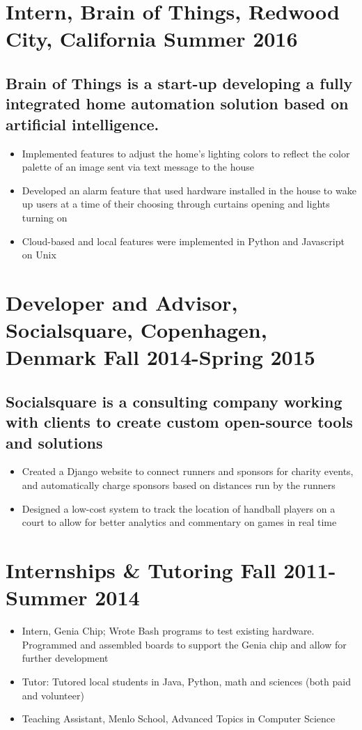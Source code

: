 \documentclass{article}
\begin{document}
\section*{\textbf{Intern, Brain of Things, Redwood City, California	\hfill Summer 2016}}
\subsection*{Brain of Things is a start-up developing a fully integrated home automation solution based on artificial intelligence. }
\begin{itemize}[noitemsep]
    \item Implemented features to adjust the home's lighting colors to reflect the color palette of an image sent via text message to the house 
    \item Developed an alarm feature that used hardware installed in the house to wake up users at a time of their choosing through curtains opening and lights turning on
    \item Cloud-based and local features were implemented in Python and Javascript on Unix
\end{itemize}

\section*{\textbf{Developer and Advisor, Socialsquare, Copenhagen, Denmark \hfill Fall 2014-Spring 2015}}
\subsection*{Socialsquare is a consulting company working with clients to create custom open-source tools and solutions}
\begin{itemize}[noitemsep]
    \item Created a Django website to connect runners and sponsors for charity events, and automatically charge sponsors based on distances run by the runners
    \item Designed a low-cost system to track the location of handball players on a court to allow for better analytics and commentary on games in real time
\end{itemize}

\section*{\textbf{Internships \& Tutoring \hfill Fall 2011- Summer 2014
}}
\begin{itemize}[noitemsep]
    \item Intern, Genia Chip; Wrote Bash programs to test existing hardware. Programmed and assembled boards to support the Genia chip and allow for further development
    \item Tutor: Tutored local students in Java, Python, math and sciences (both paid and volunteer)
    \item Teaching Assistant, Menlo School, Advanced Topics in Computer Science
\end{itemize}
\end{document}
